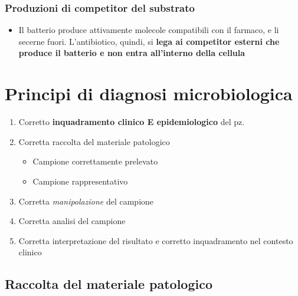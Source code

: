 \documentclass[italian,]{article}
\providecommand{\tightlist}{%
  \setlength{\itemsep}{0pt}\setlength{\parskip}{0pt}}
\begin{document}
\hypertarget{produzioni-di-competitor-del-substrato}{%
\subsubsection{Produzioni di competitor del
substrato}\label{produzioni-di-competitor-del-substrato}}

\begin{itemize}
\tightlist
\item
  Il batterio produce attivamente molecole compatibili con il farmaco, e
  li secerne fuori. L'antibiotico, quindi, si \textbf{lega ai competitor
  esterni che produce il batterio e non entra all'interno della cellula}
\end{itemize}

\hypertarget{principi-di-diagnosi-microbiologica}{%
\section{Principi di diagnosi
microbiologica}\label{principi-di-diagnosi-microbiologica}}

\begin{enumerate}
\def\labelenumi{\arabic{enumi}.}
\tightlist
\item
  Corretto \textbf{inquadramento clinico E epidemiologico} del pz.
\item
  Corretta raccolta del materiale patologico

  \begin{itemize}
  \tightlist
  \item
    Campione correttamente prelevato
  \item
    Campione rappresentativo
  \end{itemize}
\item
  Corretta \emph{manipolazione} del campione
\item
  Corretta analisi del campione
\item
  Corretta interpretazione del risultato e corretto inquadramento nel
  contesto clinico
\end{enumerate}

\hypertarget{raccolta-del-materiale-patologico}{%
\subsection{Raccolta del materiale
patologico}\label{raccolta-del-materiale-patologico}}
\end{document}
